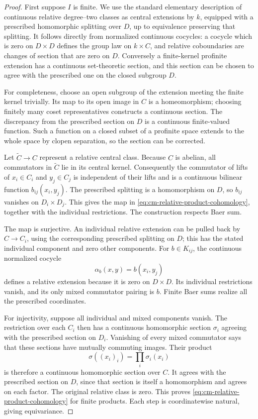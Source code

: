 \begin{proof}
First suppose \(I\) is finite. We use the standard elementary
description of continuous relative degree--two classes as central
extensions by \(k\), equipped with a prescribed homomorphic splitting
over \(D\), up to equivalence preserving that splitting. It follows
directly from normalized continuous cocycles: a cocycle which is zero
on \(D\times D\) defines the group law on \(k\times C\), and
relative coboundaries are changes of section that are zero on \(D\).
Conversely a finite-kernel profinite extension has a continuous
set-theoretic section, and this section can be chosen to agree with
the prescribed one on the closed subgroup \(D\).

For completeness, choose an open subgroup of the extension meeting
the finite kernel trivially. Its map to its open image in \(C\)
is a homeomorphism; choosing finitely many coset representatives
constructs a continuous section. The discrepancy from the prescribed
section on \(D\) is a continuous finite-valued function. Such a
function on a closed subset of a profinite space extends to the
whole space by clopen separation, so the section can be corrected.

Let \(\widetilde C\to C\) represent a relative central class.
Because \(C\) is abelian, all commutators in \(\widetilde C\)
lie in its central kernel. Consequently the commutator of lifts of
\(x_i\in C_i\) and \(y_j\in C_j\) is independent of their
lifts and is a continuous bilinear function \(b_{ij}(x_i,y_j)\).
The prescribed splitting is a homomorphism on \(D\), so
\(b_{ij}\) vanishes on \(D_i\times D_j\). This gives the map
in \eqref{eq:cm-relative-product-cohomology}, together with the individual restrictions. The construction
respects Baer sum.

The map is surjective. An individual relative extension can be
pulled back by \(C\to C_i\), using the corresponding prescribed
splitting on \(D\); this has the stated individual component and
zero other components. For \(b\in K_{ij}\), the continuous
normalized cocycle
\[
 \alpha_b(x,y)=b(x_i,y_j)
\]
defines a relative extension because it is zero on
\(D\times D\). Its individual restrictions vanish, and its only
mixed commutator pairing is \(b\). Finite Baer sums realize all
the prescribed coordinates.

For injectivity, suppose all individual and mixed components
vanish. The restriction over each \(C_i\) then has a continuous
homomorphic section \(\sigma_i\) agreeing with the prescribed
section on \(D_i\). Vanishing of every mixed commutator says that
these sections have mutually commuting images. Their product
\[
 \sigma((x_i)_i)=\prod_i\sigma_i(x_i)
\]
is therefore a continuous homomorphic section over \(C\).
It agrees with the prescribed section on \(D\), since that
section is itself a homomorphism and agrees on each factor.
The original relative class is zero. This proves \eqref{eq:cm-relative-product-cohomology} for finite
products. Each step is coordinatewise natural, giving equivariance.


\end{proof}
